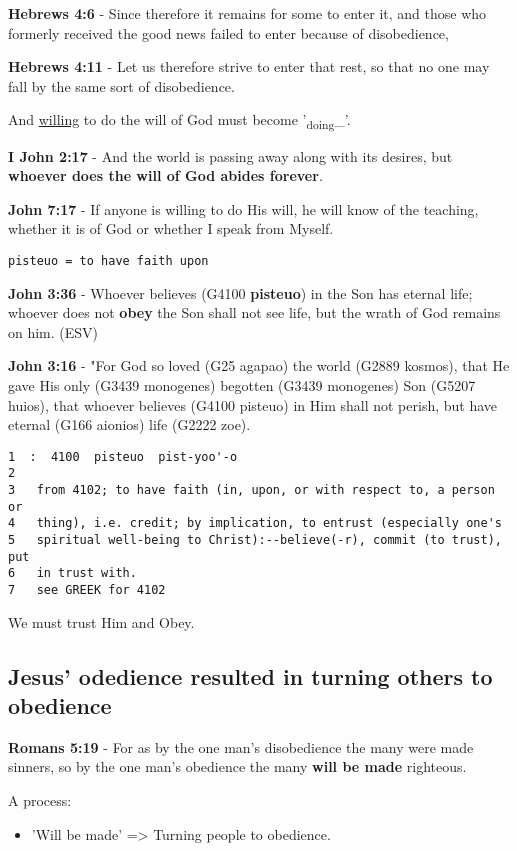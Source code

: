 \documentclass[11pt]{article}
\begin{document}
\textbf{Hebrews 4:6} - Since therefore it remains for some to enter it, and those who formerly received the good news failed to enter because of disobedience,

\textbf{Hebrews 4:11} - Let us therefore strive to enter that rest, so that no one may fall by the same sort of disobedience.

And \uline{willing} to do the will of God must become '\textsubscript{doing}\_'.

\textbf{I John 2:17} - And the world is passing away along with its desires, but \textbf{whoever does the will of God abides forever}.

\textbf{John 7:17} - If anyone is willing to do His will, he will know of the teaching, whether it is of God or whether I speak from Myself.

\texttt{pisteuo = to have faith upon}

\textbf{John 3:36} - Whoever believes (G4100 \textbf{pisteuo}) in the Son has eternal life; whoever does not \textbf{obey} the Son shall not see life, but the wrath of God remains on him. (ESV)

\textbf{John 3:16} - "For God so loved (G25 agapao) the world (G2889 kosmos), that He gave His only (G3439 monogenes) begotten (G3439 monogenes) Son (G5207 huios), that whoever believes (G4100 pisteuo) in Him shall not perish, but have eternal (G166 aionios) life (G2222 zoe).

\begin{verbatim}
1  :  4100  pisteuo  pist-yoo'-o
2  
3   from 4102; to have faith (in, upon, or with respect to, a person or
4   thing), i.e. credit; by implication, to entrust (especially one's
5   spiritual well-being to Christ):--believe(-r), commit (to trust), put
6   in trust with.
7   see GREEK for 4102
\end{verbatim}

We must trust Him and Obey.

\subsection{Jesus' odedience resulted in turning others to obedience}
\label{sec:org295bb1e}
\textbf{Romans 5:19} - For as by the one man's disobedience the many were made sinners, so by the one man's obedience the many \textbf{will be made} righteous.

A process:
\begin{itemize}
\item 'Will be made' => Turning people to obedience.
\end{itemize}
\end{document}
